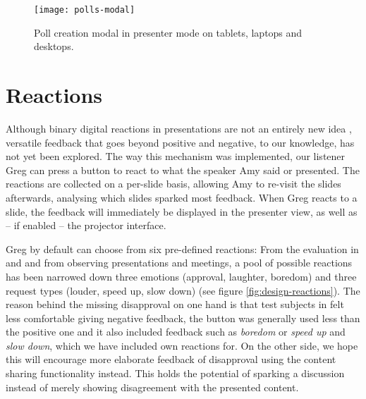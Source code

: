 \begin{figure}
\centering
\texttt{[image: polls-modal]}
\caption{Poll creation modal in presenter mode on tablets, laptops and desktops.}
\label{fig:design-polls-modal}
\end{figure}

\section{Reactions}
\label{sec:design-reactions}
Although binary digital reactions in presentations are not an entirely new idea \cite{Teevan:MobileFeedbackDuringPresentation}, versatile feedback that goes beyond positive and negative, to our knowledge, has not yet been explored. The way this mechanism was implemented, our listener Greg can press a button to react to what the speaker Amy said or presented. The reactions are collected on a per-slide basis, allowing Amy to re-visit the slides afterwards, analysing which slides sparked most feedback. When Greg reacts to a slide, the feedback will immediately be displayed in the presenter view, as well as -- if enabled -- the projector interface.

Greg by default can choose from six pre-defined reactions: From the evaluation in \cite{Teevan:MobileFeedbackDuringPresentation} and \cite{Isaacs:InteractivePresentationsDistributedAudience} and from observing presentations and meetings, a pool of possible reactions has been narrowed down three emotions (approval, laughter, boredom) and three request types (louder, speed up, slow down) (see figure \ref{fig:design-reactions}). The reason behind the missing disapproval on one hand is that test subjects in \cite{Teevan:MobileFeedbackDuringPresentation} felt less comfortable giving negative feedback, the button was generally used less than the positive one and it also included feedback such as \emph{boredom} or \emph{speed up} and \emph{slow down}, which we have included own reactions for. On the other side, we hope this will encourage more elaborate feedback of disapproval using the content sharing functionality instead. This holds the potential of sparking a discussion instead of merely showing disagreement with the presented content.


